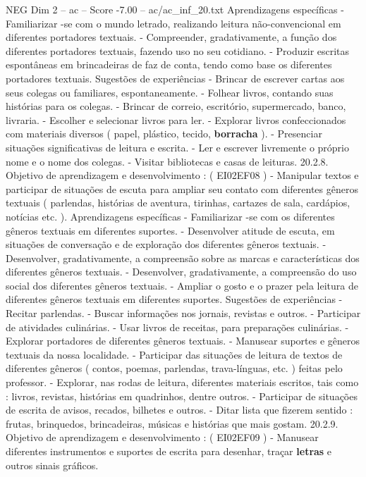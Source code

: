 \begin{textsample}{NEG Dim 2 – ac – Score -7.00 – ac/ac\_inf\_20.txt}
Aprendizagens específicas - Familiarizar -se com o mundo letrado, realizando leitura não-convencional em diferentes portadores textuais. - Compreender, gradativamente, a função dos diferentes portadores textuais, fazendo uso no seu cotidiano. - Produzir escritas espontâneas em brincadeiras de faz de conta, tendo como base os diferentes portadores textuais.
Sugestões de experiências - Brincar de escrever cartas aos seus colegas ou familiares, espontaneamente. - Folhear livros, contando suas histórias para os colegas. - Brincar de correio, escritório, supermercado, banco, livraria. - Escolher e selecionar livros para ler. - Explorar livros confeccionados com materiais diversos ( papel, plástico, tecido, \textbf{borracha} ). - Presenciar situações significativas de leitura e escrita. - Ler e escrever livremente o próprio nome e o nome dos colegas. - Visitar bibliotecas e casas de leituras. 20.2.8.
Objetivo de aprendizagem e desenvolvimento : ( EI02EF08 ) - Manipular textos e participar de situações de escuta para ampliar seu contato com diferentes gêneros textuais ( parlendas, histórias de aventura, tirinhas, cartazes de sala, cardápios, notícias etc. ).
Aprendizagens específicas - Familiarizar -se com os diferentes gêneros textuais em diferentes suportes. - Desenvolver atitude de escuta, em situações de conversação e de exploração dos diferentes gêneros textuais. - Desenvolver, gradativamente, a compreensão sobre as marcas e características dos diferentes gêneros textuais. - Desenvolver, gradativamente, a compreensão do uso social dos diferentes gêneros textuais. - Ampliar o gosto e o prazer pela leitura de diferentes gêneros textuais em diferentes suportes.
Sugestões de experiências - Recitar parlendas. - Buscar informações nos jornais, revistas e outros. - Participar de atividades culinárias. - Usar livros de receitas, para preparações culinárias. - Explorar portadores de diferentes gêneros textuais. - Manusear suportes e gêneros textuais da nossa localidade. - Participar das situações de leitura de textos de diferentes gêneros ( contos, poemas, parlendas, trava-línguas, etc. ) feitas pelo professor. - Explorar, nas rodas de leitura, diferentes materiais escritos, tais como : livros, revistas, histórias em quadrinhos, dentre outros. - Participar de situações de escrita de avisos, recados, bilhetes e outros. - Ditar lista que fizerem sentido : frutas, brinquedos, brincadeiras, músicas e histórias que mais gostam. 20.2.9.
Objetivo de aprendizagem e desenvolvimento : ( EI02EF09 ) - Manusear diferentes instrumentos e suportes de escrita para desenhar, traçar \textbf{letras} e outros sinais gráficos.

\end{textsample}
